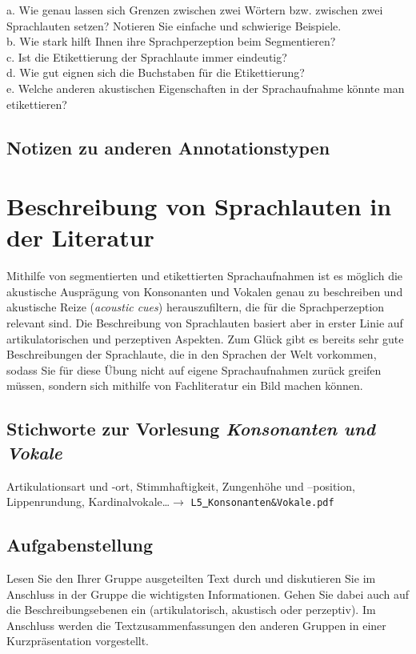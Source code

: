 \documentclass[11pt]{book}
\begin{document}
a.	Wie genau lassen sich Grenzen zwischen zwei Wörtern bzw. zwischen zwei Sprachlauten setzen? Notieren Sie einfache und schwierige Beispiele. \vspace{5cm}\\
b.	Wie stark hilft Ihnen ihre Sprachperzeption beim Segmentieren? \vspace{5cm}\\
\newpage
c.	Ist die Etikettierung der Sprachlaute immer eindeutig? \vspace{5cm}\\
d.	Wie gut eignen sich die Buchstaben für die Etikettierung? \vspace{5cm}\\
e.	Welche anderen akustischen Eigenschaften in der Sprachaufnahme könnte man etikettieren? \vspace*{5cm}\\
\newpage
\section{Notizen zu anderen Annotationstypen} 






\chapter{Beschreibung von Sprachlauten in der Literatur}

Mithilfe von segmentierten und etikettierten Sprachaufnahmen ist es möglich die akustische Ausprägung von Konsonanten und Vokalen genau zu beschreiben und akustische Reize (\emph{acoustic cues}) herauszufiltern, die für die Sprachperzeption relevant sind. Die Beschreibung von Sprachlauten basiert aber in erster Linie auf artikulatorischen und perzeptiven Aspekten. Zum Glück gibt es bereits sehr gute Beschreibungen der Sprachlaute, die in den Sprachen der Welt vorkommen, sodass Sie für diese Übung nicht auf eigene Sprachaufnahmen zurück greifen müssen, sondern sich mithilfe von Fachliteratur ein Bild machen können.

\section{Stichworte zur Vorlesung \em{Konsonanten und Vokale}}
Artikulationsart und -ort, Stimmhaftigkeit, Zungenhöhe und –position, Lippenrundung, Kardinalvokale\dots $\rightarrow$ {\tt L5\underline{\ }Konsonanten{\&}Vokale.pdf}

\section{Aufgabenstellung}
Lesen Sie den Ihrer Gruppe ausgeteilten Text durch und diskutieren Sie im Anschluss in der Gruppe die wichtigsten Informationen. Gehen Sie dabei auch auf die Beschreibungsebenen ein (artikulatorisch, akustisch oder perzeptiv). Im Anschluss werden die Textzusammenfassungen den anderen Gruppen in einer Kurzpräsentation vorgestellt.
\newline
\end{document}
